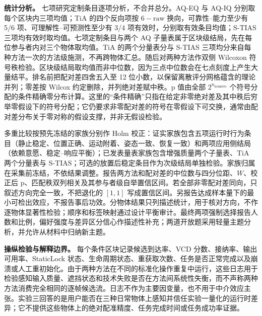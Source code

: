 \documentclass[review]{vgtc}
\begin{document}
\textbf{统计分析。} 七项研究定制条目逐项分析，不合并总分。AQ-EQ 与 AQ-IQ 分别取每个区块内三项均值；TiA 的四个反向项按 $6-\mathrm{raw}$ 换向，可靠性--能力至少有 5/6 项、可理解性--可预测性至少有 3/4 项有效时，分别取有效条目均值；S-TIAS 三项均有效时取均值。七项定制条目与两个 AQ 子量表属于区块级结局，先在每位参与者内对三个物体取均值。TiA 的两个分量表分与 S-TIAS 三项均分来自每种方法一次的方法级施测，不再跨物体汇总。随后对两种方法作双侧 Wilcoxon 符号秩检验。区块级结局取均值而非中位数，因为三点中位数会在七点刻度上产生大量结平。排名前把配对差四舍五入至 12 位小数，以保留离散评分网格蕴含的理论并列；零差按 Wilcox 约定删除，并列绝对差赋中秩。p 值由全部 $2^{n_{\mathrm{nonzero}}}$ 个符号分配的条件精确零分布计算。这里的“条件精确”只指在给定非零绝对差及其中秩后穷举零假设下的符号分配；它仍要求非零配对差的符号在零假设下可交换，通常由配对差分布关于零对称的假设支撑，并非无假设检验。

多重比较按预先冻结的家族分别作 Holm 校正：证实家族包含五项运行时行为条目（静止稳定、位置正确、运动附着、姿态一致、恢复一致）和两项应用侧结局（依赖意愿、稳定--响应平衡）；已发表量表家族包含增强质量两个子量表、TiA 两个分量表与 S-TIAS；可选的放置后稳定条目作为次级结局单独检验。家族归属在采集前冻结，不依结果调整。报告两方法和配对差的中位数与四分位距、$W$、校正后 p、匹配秩双列相关及其参与者级自举置信区间。若全部非零配对差同向，只叙述方向完全一致，不把退化的 $[1,1]$ 写成置信区间。另报告达成样本量下的最小可检出效应，不报告事后功效。分物体结果只列描述统计，用于核对方向，不作逐物体显著性检验；顺序和标签映射通过设计平衡审计。最终两项强制选择报告人数和比例，偏好强度与差异区分信心作描述性补充；两道开放题采用轻量主题分析，并允许从材料中归纳新主题。

\textbf{操纵检验与解释边界。} 每个条件区块记录候选到达率、VCD 分数、接纳率、输出可用率、StaticLock 状态、生命周期状态、重获取次数、任务是否正常完成以及崩溃或人工重初始化。由于两种方法在不同的标准化操作重复中运行，这些日志用于检验感知输入质量、遮挡状态和技术失败是否在方法间系统性失衡，而不声称两种方法消费完全相同的逐帧候选流。日志不作为主要因变量，也不用于中介效应主张。实验三回答的是用户能否在三种日常物体上感知并信任实验一量化的运行时差异；它不提供这些物体上的绝对配准精度、任务完成时间或任务成功率证据。

\end{document}
